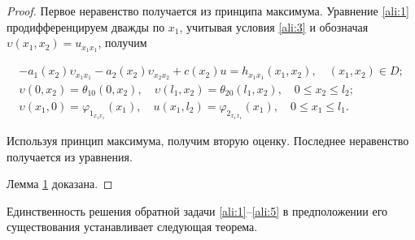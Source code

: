 \begin{proof} Первое неравенство получается из принципа максимума. Уравнение \eqref{ali:1} продифференцируем дважды по $x_1$, учитывая условия \eqref{ali:3} и обозначая $\upsilon(x_1, x_2)=u_{x_1x_1}$, получим 

\begin{gather*}

-a_1(x_2)\upsilon_{x_1x_1}-a_2(x_2)\upsilon_{x_2x_2}+c(x_2)u=h_{x_1x_1}(x_1,x_2), \quad (x_1,x_2)\in D;

\\

\upsilon(0,x_2)=\theta_{10}(0,x_2), \quad \upsilon(l_1,x_2)=\theta_{20}(l_1,x_2), \quad 0\le x_2\le l_2;

\\

\upsilon(x_1,0)=\varphi_{1_{x_1x_1}}(x_1), \quad u(x_1,l_2)=\varphi_{2_{x_1x_1}}(x_1), \quad 0\le x_1\le l_1.

\end{gather*}



Используя принцип максимума, получим вторую оценку. Последнее неравенство получается из уравнения. 

Лемма \hyperlink{ali:lemma1}{1} доказана. \end{proof}



\smallskip



Единственность решения обратной задачи \eqref{ali:1}--\eqref{ali:5} в предположении его существования устанавливает следующая теорема.



\smallskip



\hypertarget{ali:thm1}{}



